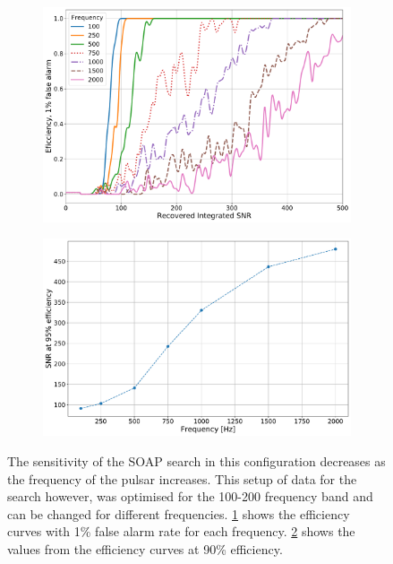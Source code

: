 \begin{figure}
	
	\begin{subfigure}[h]{0.9\linewidth}
			\centering
			\includegraphics[width=\linewidth]{C3_soap/snr_freq_eff.pdf}
			\caption{}
			\label{soap:sens:eff}
	\end{subfigure}

	\begin{subfigure}[h]{0.9\linewidth}
		\centering
		\includegraphics[width=\linewidth]{C3_soap/snr_with_freq.pdf}
		\caption{}
		\label{soap:sens:snrfreq}
	\end{subfigure}

\caption[How the sensitivity of SOAP changes with frequency.]{The sensitivity of the SOAP search in this configuration decreases as the frequency of the pulsar increases. This setup of data for the search however, was optimised for the 100-200 frequency band and can be changed for different frequencies. \ref{soap:sens:eff} shows the efficiency curves with 1\% false alarm rate for each frequency. \ref{soap:sens:snrfreq} shows the values from the efficiency curves at 90\% efficiency.}
\label{soap:sens:results}

\end{figure}

